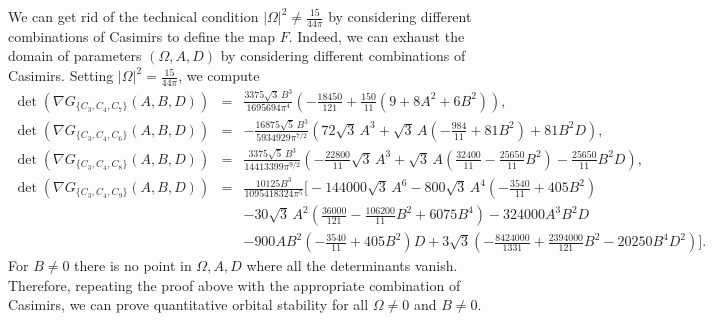 \documentclass{amsart}
\begin{document}
We can get rid of the technical condition $|\Omega|^2\neq \frac{15}{44\pi}$ by considering different combinations of Casimirs to define the map $F$. Indeed, we can exhaust the domain of parameters $(\Omega,A,D)$ by considering different combinations of Casimirs.
Setting $|\Omega|^2=\frac{15}{44\pi}$, we compute
\begin{eqnarray*}
    \det(\nabla G_{\{C_3,C_4,C_7\}}(A,B,D))&=&\frac{3375 \sqrt{3}\, B^{3} }{1695694 \pi^{4}}\left( -\frac{18450}{121} + \frac{150}{11} \left( 9 + 8 A^{2} + 6 B^{2} \right) \right),\\
    \det(\nabla G_{\{C_3,C_4,C_6\}}(A,B,D))&=&-\frac{16875 \sqrt{5}\, B^{3}}{5934929 \pi^{7/2}}\left( 72 \sqrt{3}\, A^{3} + \sqrt{3}\, A \left( -\tfrac{984}{11} + 81 B^{2} \right) + 81 B^{2} D \right),\\
    \det(\nabla G_{\{C_3,C_4,C_8\}}(A,B,D))&=&\frac{3375 \sqrt{5}\, B^{3}}{14413399 \pi^{9/2}}\left( -\tfrac{22800}{11} \sqrt{3}\, A^{3} + \sqrt{3}\, A \left( \tfrac{32400}{11} - \tfrac{25650}{11} B^{2} \right) - \tfrac{25650}{11} B^{2} D \right),\\
    \det(\nabla G_{\{C_3,C_4,C_9\}}(A,B,D))&=&\frac{10125 B^{3}}{1095418324 \pi^{5}}\Big[-144000 \sqrt{3}\, A^{6} - 800 \sqrt{3}\, A^{4} \left( -\tfrac{3540}{11} + 405 B^{2} \right)\\
    &&- 30 \sqrt{3}\, A^{2} \left( \tfrac{36000}{121} - \tfrac{106200}{11} B^{2} + 6075 B^{4} \right) - 324000 A^{3} B^{2} D\\
    &&- 900 A B^{2} \left( -\tfrac{3540}{11} + 405 B^{2} \right) D+3 \sqrt{3} \left( -\tfrac{8424000}{1331} + \tfrac{2394000}{121} B^{2} - 20250 B^{4} D^{2} \right)\Big].
\end{eqnarray*}
For $B\neq 0$ there is no point in $\Omega,A,D$ where all the determinants vanish. Therefore, repeating the proof above with the appropriate combination of Casimirs, we can prove quantitative orbital stability for all $\Omega\neq0$ and $B\neq0$.
\end{document}
